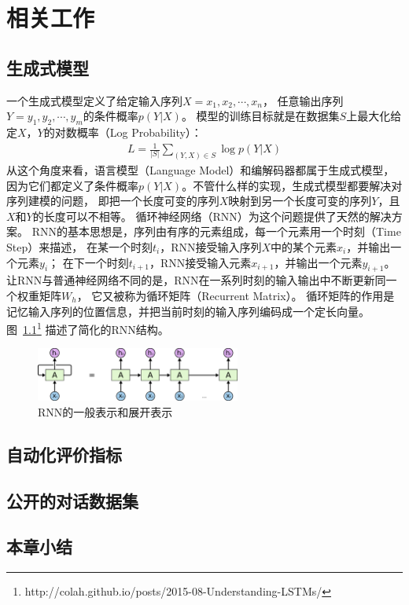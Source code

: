 
\chapter{相关工作}\label{ch:related_work}
\section{生成式模型}\label{sec:generative_model}
一个生成式模型定义了给定输入序列$X = x_1, x_2, \cdots, x_n$，
任意输出序列$Y = y_1, y_2, \cdots, y_m$的条件概率$p(Y|X)$。
模型的训练目标就是在数据集$S$上最大化给定$X$，$Y$的对数概率（Log Probability）：
\begin{align}
    \mathit{L} = \frac{1}{|S|} \sum_{(Y, X) \in S} \log p(Y|X)
\end{align}
从这个角度来看，语言模型（Language Model）和编解码器都属于生成式模型，
因为它们都定义了条件概率$p(Y|X)$。不管什么样的实现，生成式模型都要解决对序列建模的问题，
即把一个长度可变的序列$X$映射到另一个长度可变的序列$Y$，且$X$和$Y$的长度可以不相等。
循环神经网络（RNN）为这个问题提供了天然的解决方案。
RNN的基本思想是，序列由有序的元素组成，每一个元素用一个时刻（Time Step）来描述，
在某一个时刻$t_i$，RNN接受输入序列$X$中的某个元素$x_i$，并输出一个元素$y_i$；
在下一个时刻$t_{i+1}$，RNN接受输入元素$x_{i+1}$，并输出一个元素$y_{i+1}$。
让RNN与普通神经网络不同的是，RNN在一系列时刻的输入输出中不断更新同一个权重矩阵$W_{h}$，
它又被称为循环矩阵（Recurrent Matrix）。
循环矩阵的作用是记忆输入序列的位置信息，并把当前时刻的输入序列编码成一个定长向量。
图~\ref{fig:RNN_unrolled}\footnote{http://colah.github.io/posts/2015-08-Understanding-LSTMs/}
描述了简化的RNN结构。
\begin{figure}[H]
    \centering
    \includegraphics[width=0.6\textwidth]{figure/RNN-unrolled.png}
    \caption{RNN的一般表示和展开表示}
    \label{fig:RNN_unrolled}
\end{figure}

\section{自动化评价指标}\label{sec:automatic_metric}

\section{公开的对话数据集}\label{sec:public_dataset}

\section{本章小结}\label{sec:rw_conclusion}
